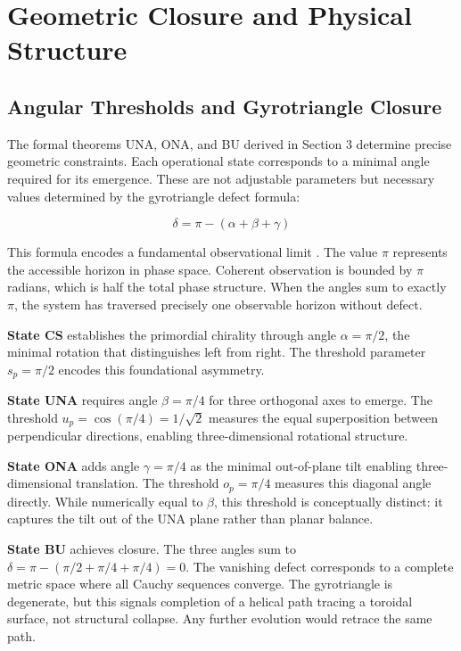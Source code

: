 \documentclass[11pt,a4paper]{article}
\theoremstyle{definition}
\theoremstyle{remark}
\begin{document}
\section{Geometric Closure and Physical Structure}

\subsection{Angular Thresholds and Gyrotriangle Closure}

The formal theorems UNA, ONA, and BU derived in Section 3 determine precise geometric constraints. Each operational state corresponds to a minimal angle required for its emergence. These are not adjustable parameters but necessary values determined by the gyrotriangle defect formula:

\begin{equation}
\delta = \pi - (\alpha + \beta + \gamma)
\end{equation}

This formula encodes a fundamental observational limit \cite{Ungar2008}. The value $\pi$ represents the accessible horizon in phase space. Coherent observation is bounded by $\pi$ radians, which is half the total phase structure. When the angles sum to exactly $\pi$, the system has traversed precisely one observable horizon without defect.

\textbf{State CS} establishes the primordial chirality through angle $\alpha = \pi/2$, the minimal rotation that distinguishes left from right. The threshold parameter $s_p = \pi/2$ encodes this foundational asymmetry.

\textbf{State UNA} requires angle $\beta = \pi/4$ for three orthogonal axes to emerge. The threshold $u_p = \cos(\pi/4) = 1/\sqrt{2}$ measures the equal superposition between perpendicular directions, enabling three-dimensional rotational structure.

\textbf{State ONA} adds angle $\gamma = \pi/4$ as the minimal out-of-plane tilt enabling three-dimensional translation. The threshold $o_p = \pi/4$ measures this diagonal angle directly. While numerically equal to $\beta$, this threshold is conceptually distinct: it captures the tilt out of the UNA plane rather than planar balance.

\textbf{State BU} achieves closure. The three angles sum to $\delta = \pi - (\pi/2 + \pi/4 + \pi/4) = 0$. The vanishing defect corresponds to a complete metric space where all Cauchy sequences converge. The gyrotriangle is degenerate, but this signals completion of a helical path tracing a toroidal surface, not structural collapse. Any further evolution would retrace the same path.
\end{document}
